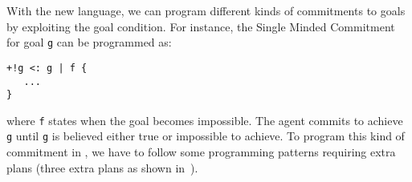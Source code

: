 With the new language, we can program different kinds of commitments
to goals~\cite{cohen:90,winikoff:02} by exploiting the goal
condition. For instance, the Single Minded Commitment for goal
\texttt{g} can be programmed as:
\begin{small}
\begin{verbatim}
+!g <: g | f {
   ...
}
\end{verbatim}
\end{small}
where \texttt{f} states when the goal becomes impossible. The agent
commits to achieve \texttt{g} until \texttt{g} is believed either true
or impossible to achieve. To program this kind of commitment in \asl,
we have to follow some programming patterns requiring extra plans
(three extra plans as shown in~\cite{hubner:06b}).




